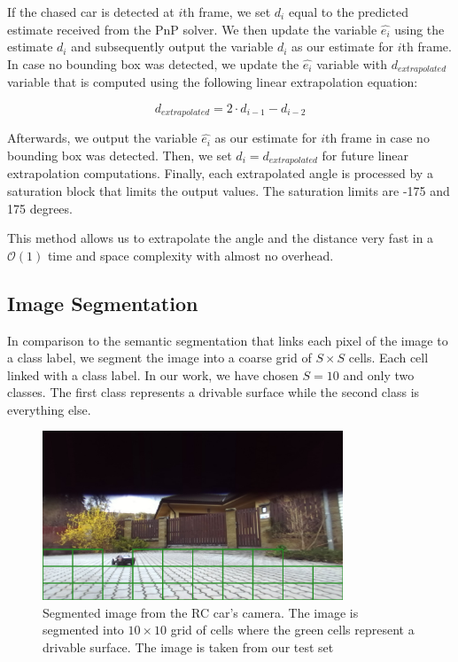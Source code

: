 \documentclass{ctuthesis/ctuthesis}
\begin{document}
If the chased car is detected at $i$th frame, we set $d_i$ equal to the predicted estimate received from the PnP solver. We then update the variable $\hat{e_{i}}$ using the estimate $d_i$ and subsequently output the variable $d_i$ as our estimate for $i$th frame. In case no bounding box was detected, we update the $\hat{e_{i}}$ variable with $d_{extrapolated}$ variable that is computed using the following linear extrapolation equation:


\begin{equation}
d_{extrapolated} = 2\cdot d_{i-1} - d_{i-2}
\end{equation}

Afterwards, we output the variable $\hat{e_{i}}$ as our estimate for $i$th frame in case no bounding box was detected. Then, we set $d_i = d_{extrapolated}$ for future linear extrapolation computations. Finally, each extrapolated angle is processed by a saturation block that limits the output values. The saturation limits are -175 and 175 degrees. \par


This method allows us to extrapolate the angle and the distance very fast in a $\mathcal{O}(1)$ time and space complexity with almost no overhead.




\subsection{Image Segmentation}\label{s:Image_Segmentation}
In comparison to the semantic segmentation that links each pixel of the image to a class label, we segment the image into a coarse grid of $S\times S$ cells. Each cell linked with a class label. In our work, we have chosen $S=10$ and only two classes. The first class represents a drivable surface while the second class is everything else. \par


\begin{figure}[h!]
    \centering
    \includegraphics[width=0.8\textwidth]{images/segmented_image.png}
    
    \caption[Segmented image from the RC car's camera]{Segmented image from the RC car's camera. The image is segmented into $10\times 10$ grid of cells where the green cells represent a drivable surface. The image is taken from our test set}\label{f:segmented_image}
\end{figure}
\end{document}

